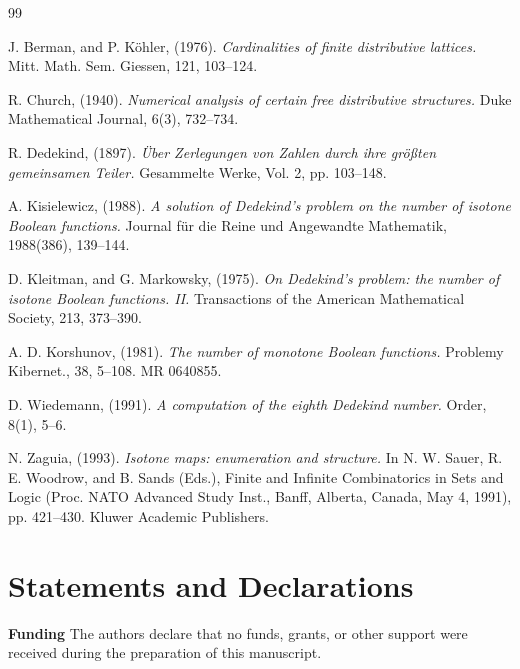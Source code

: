 \documentclass{amsart}
\theoremstyle{definition}
\begin{document}
\begin{thebibliography}{99}

 J. Berman, and P. K\"{o}hler, (1976). \emph{Cardinalities of finite distributive lattices.} Mitt. Math. Sem. Giessen, 121, 103–124. 

 R. Church, (1940). \emph{Numerical analysis of certain free distributive structures.} Duke Mathematical Journal, 6(3), 732–734. 

 R. Dedekind, (1897). \emph{\"{U}ber Zerlegungen von Zahlen durch ihre gr\"{o}\ss ten gemeinsamen Teiler.} Gesammelte Werke, Vol. 2, pp. 103–148.

 A. Kisielewicz, (1988). \emph{A solution of Dedekind's problem on the number of isotone Boolean functions.} Journal f\"{u}r die Reine und Angewandte Mathematik, 1988(386), 139–144. 

 D. Kleitman, and G. Markowsky, (1975). \emph{On Dedekind's problem: the number of isotone Boolean functions. II.} Transactions of the American Mathematical Society, 213, 373–390. 

 A. D. Korshunov, (1981). \emph{The number of monotone Boolean functions.} Problemy Kibernet., 38, 5–108. MR 0640855.

 D. Wiedemann, (1991). \emph{A computation of the eighth Dedekind number.} Order, 8(1), 5–6. 

 N. Zaguia, (1993). \emph{Isotone maps: enumeration and structure.} In N. W. Sauer, R. E. Woodrow, and B. Sands (Eds.), Finite and Infinite Combinatorics in Sets and Logic (Proc. NATO Advanced Study Inst., Banff, Alberta, Canada, May 4, 1991), pp. 421–430. Kluwer Academic Publishers. 

\end{thebibliography}
\section*{Statements and Declarations}

\textbf{Funding}
The authors declare that no funds, grants, or other support were received during the preparation of this manuscript.
\end{document}
